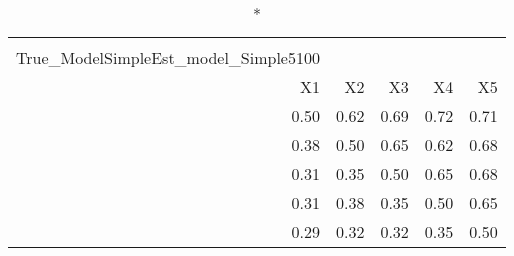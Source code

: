 \begin{longtable}{rrrrr}
\caption*{
{\large Pestmatrix} \\ 
{\small True\_ModelSimpleEst\_model\_Simple5100}
} \\ 
\toprule
X1 & X2 & X3 & X4 & X5 \\ 
\midrule
0.50 & 0.62 & 0.69 & 0.72 & 0.71 \\ 
0.38 & 0.50 & 0.65 & 0.62 & 0.68 \\ 
0.31 & 0.35 & 0.50 & 0.65 & 0.68 \\ 
0.31 & 0.38 & 0.35 & 0.50 & 0.65 \\ 
0.29 & 0.32 & 0.32 & 0.35 & 0.50 \\ 
\bottomrule
\end{longtable}

